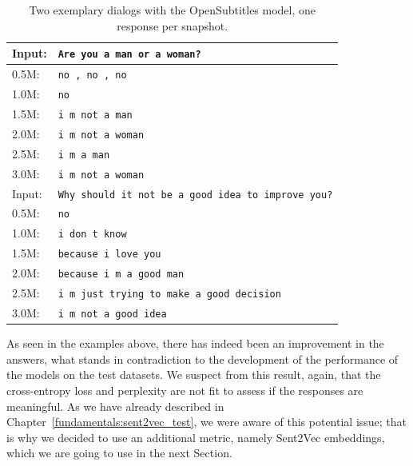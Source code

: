 \begin{table}[H]
	\centering
	\begin{adjustbox}{max width=\textwidth}
		\begin{tabularx}{\textwidth}{lX}
			\toprule
			Input: 	& \texttt{Are you a man or a woman?}\\
			\midrule
			0.5M: 	& \texttt{no , no , no}\\
			1.0M: 	& \texttt{no}\\
			1.5M:	& \texttt{i m not a man}\\
			2.0M:	& \texttt{i m not a woman}\\
			2.5M:	& \texttt{i m a man}\\
			3.0M:	& \texttt{i m not a woman}\\
			\midrule
			Input: 	& \texttt{Why should it not be a good idea to improve you?}\\
			\midrule
			0.5M: 	& \texttt{no}\\
			1.0M: 	& \texttt{i don t know}\\
			1.5M:	& \texttt{because i love you}\\
			2.0M:	& \texttt{because i m a good man}\\
			2.5M:	& \texttt{i m just trying to make a good decision}\\
			3.0M:	& \texttt{i m not a good idea}\\
			\bottomrule
		\end{tabularx}
	\end{adjustbox}
	\caption{Two exemplary dialogs with the OpenSubtitles model, one response per snapshot.}
	\label{results:example_output:opensubtitles}
\end{table}

As seen in the examples above, there has indeed been an improvement in the answers, what stands in contradiction to the development of the performance of the models on the test datasets. We suspect from this result, again, that the cross-entropy loss and perplexity are not fit to assess if the responses are meaningful. As we have already described in Chapter~\ref{fundamentals:sent2vec_test}, we were aware of this potential issue; that is why we decided to use an additional metric, namely Sent2Vec embeddings, which we are going to use in the next Section.

